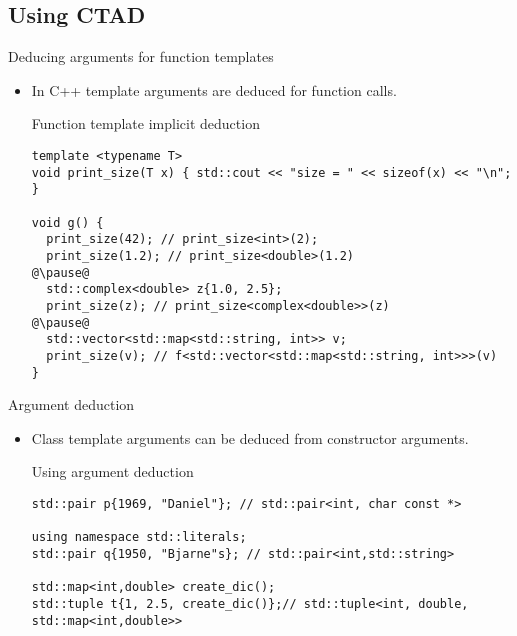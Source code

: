 \subsection{Using CTAD}

\begin{frame}[t,fragile]{Deducing arguments for function templates}
\begin{itemize}
  \item In C++ template arguments are 
        deduced for function calls.
\begin{block}{Function template implicit deduction}
\begin{lstlisting}[escapechar=@]
template <typename T>
void print_size(T x) { std::cout << "size = " << sizeof(x) << "\n"; }

void g() {
  print_size(42); // print_size<int>(2);
  print_size(1.2); // print_size<double>(1.2)
@\pause@   
  std::complex<double> z{1.0, 2.5};
  print_size(z); // print_size<complex<double>>(z)
@\pause@   
  std::vector<std::map<std::string, int>> v;
  print_size(v); // f<std::vector<std::map<std::string, int>>>(v)
}
\end{lstlisting}
\end{block}
\end{itemize}
\end{frame}

\begin{frame}[t,fragile]{Argument deduction}
\begin{itemize}
  \item Class template arguments can be deduced from constructor arguments.

\begin{block}{Using argument deduction}
\begin{lstlisting}
std::pair p{1969, "Daniel"}; // std::pair<int, char const *>

using namespace std::literals;
std::pair q{1950, "Bjarne"s}; // std::pair<int,std::string>

std::map<int,double> create_dic();
std::tuple t{1, 2.5, create_dic()};// std::tuple<int, double, std::map<int,double>>
\end{lstlisting}
\end{block}

\end{itemize}
\end{frame}

